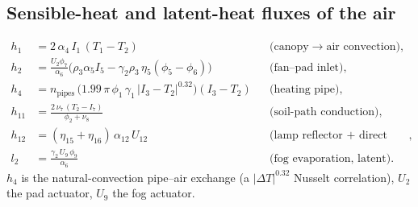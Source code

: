 \documentclass[11pt,a4paper]{article}
\newcommand{\Tcan}{T_{1}}
\newcommand{\Tair}{T_{2}}
\begin{document}
\subsection{Sensible-heat and latent-heat fluxes of the air}\label{sec:heatfluxes}
\begin{align}
  h_1 &= 2\,\alpha_4\,I_1\,(\Tcan - \Tair) &&\text{(canopy}\to\text{air convection)},\\
  h_2 &= \frac{U_2\phi_7}{\alpha_6}\Big(\rho_3\alpha_5 I_5 - \gamma_2\rho_3\,\eta_5(\phi_5-\phi_6)\Big) &&\text{(fan--pad inlet)},\\
  h_4 &= n_{\text{pipes}}\,\big(1.99\,\pi\,\phi_1\,\gamma_1\,|I_3-\Tair|^{0.32}\big)(I_3-\Tair) &&\text{(heating pipe)},\\
  h_{11} &= \frac{2\,\nu_7\,(\Tair - I_7)}{\phi_2+\nu_8} &&\text{(soil-path conduction)},\\
  h_{12} &= (\eta_{15}+\eta_{16})\,\alpha_{12}\,U_{12} &&\text{(lamp reflector + direct heat)},\\
  l_2 &= \frac{\gamma_2\,U_9\,\phi_9}{\alpha_6} &&\text{(fog evaporation, latent)}.
\end{align}
$h_4$ is the natural-convection pipe--air exchange (a $|\Delta T|^{0.32}$ Nusselt correlation),
$U_2$ the pad actuator, $U_9$ the fog actuator.
\end{document}
